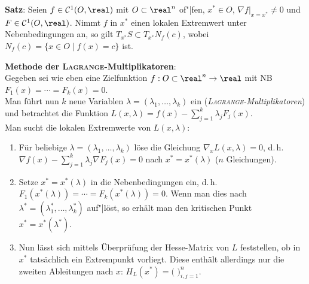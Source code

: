 \textbf{Satz}:
Seien $f \in \C^1(O, \real)$ mit $O \subset \real^n$ of"|fen,
$x^\ast \in O$, $\nabla f|_{x=x^\ast} \not= 0$ und $F \in \C^1(O, \real)$.
Nimmt $f$ in $x^\ast$ einen lokalen Extremwert unter Nebenbedingungen an,
so gilt $T_{x^\ast} S \subset T_{x^\ast} N_f(c)$, wobei
$N_f(c) = \{x \in O \;|\; f(x) = c\}$ ist.

\linie

\textbf{Methode der \textsc{Lagrange}-Multiplikatoren}: \\
Gegeben sei wie eben eine Zielfunktion $f: O \subset \real^n \rightarrow \real$
mit NB $F_1(x) = \dotsb = F_k(x) = 0$. \\
Man führt nun $k$ neue Variablen $\lambda = (\lambda_1, \dotsc, \lambda_k)$ ein
(\emph{\textsc{Lagrange}-Multiplikatoren}) und betrachtet die Funktion
$L(x, \lambda) = f(x) - \sum_{j=1}^k \lambda_j F_j(x)$. \\
Man sucht die lokalen Extremwerte von $L(x, \lambda)$:
\begin{enumerate}
    \item
    Für beliebige $\lambda = (\lambda_1, \dotsc, \lambda_k)$
    löse die Gleichung $\nabla_x L(x, \lambda) = 0$, d.\,h. \\
    $\nabla f(x) - \sum_{j=1}^k \lambda_j \nabla F_j(x) = 0$
    nach $x^\ast = x^\ast(\lambda)$
    ($n$ Gleichungen).
    
    \item
    Setze $x^\ast = x^\ast(\lambda)$ in die Nebenbedingungen ein, d.\,h.
    $F_1(x^\ast(\lambda)) = \dotsb = F_k(x^\ast(\lambda)) = 0$.
    Wenn man dies nach
    $\lambda^\ast = (\lambda_1^\ast, \dotsc, \lambda_k^\ast)$ auf"|löst, so
    erhält man den kritischen Punkt \\
    $x^\ast = x^\ast(\lambda^\ast)$.
    
    \item
    Nun lässt sich mittels Überprüfung der Hesse-Matrix von $L$ feststellen,
    ob in $x^\ast$ tatsächlich ein Extrempunkt vorliegt.
    Diese enthält allerdings nur die zweiten Ableitungen nach $x$:
    $H_L(x^\ast) = \Big($%
    $\Big)_{i,j=1}^n$.
\end{enumerate}

\pagebreak
